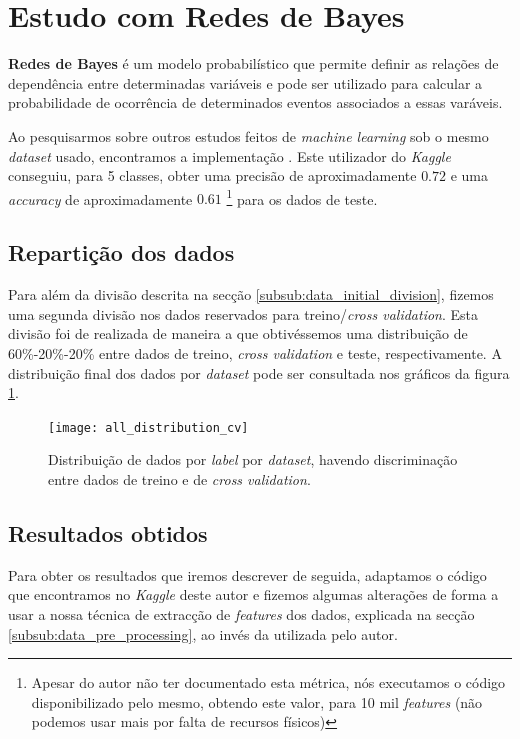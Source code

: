 \section{Estudo com Redes de Bayes}
\label{sec:bayes}

\textbf{Redes de Bayes} é um modelo probabilístico que permite definir as relações de dependência entre determinadas variáveis e pode ser utilizado para calcular a probabilidade de ocorrência de determinados eventos associados a essas varáveis.

Ao pesquisarmos sobre outros estudos feitos de \textit{machine learning} sob o mesmo \textit{dataset} usado, encontramos a implementação \cite{kaggle_bayes}. Este utilizador do \textit{Kaggle} conseguiu, para 5 classes, obter uma precisão de aproximadamente $0.72$ e uma \textit{accuracy} de aproximadamente $0.61$ \footnote{Apesar do autor não ter documentado esta métrica, nós executamos o código disponibilizado pelo mesmo, obtendo este valor, para 10 mil \textit{features} (não podemos usar mais por falta de recursos físicos)} para os dados de teste.


\subsection{Repartição dos dados}
\label{subsub:bayes_data}

Para além da divisão descrita na secção \ref{subsub:data_initial_division}, fizemos uma segunda divisão nos dados reservados para treino/\textit{cross validation}. Esta divisão foi de realizada de maneira a que obtivéssemos uma distribuição de 60\%-20\%-20\% entre dados de treino, \textit{cross validation} e teste, respectivamente. A distribuição final dos dados por \textit{dataset} pode ser consultada nos gráficos da figura \ref{fig:data_distribution_with_cv}.

\begin{figure}[!t]
	\centering
	\texttt{[image: all\_distribution\_cv]}
	\caption{Distribuição de dados por \textit{label} por \textit{dataset}, havendo discriminação entre dados de treino e de \textit{cross validation}.}
	\label{fig:data_distribution_with_cv}
\end{figure}


\subsection{Resultados obtidos}
\label{sub:results_bayes}

Para obter os resultados que iremos descrever de seguida, adaptamos o código que encontramos no \textit{Kaggle} deste autor e fizemos algumas alterações de forma a usar a nossa técnica de extracção de \textit{features} dos dados, explicada na secção \ref{subsub:data_pre_processing}, ao invés da utilizada pelo autor. 

